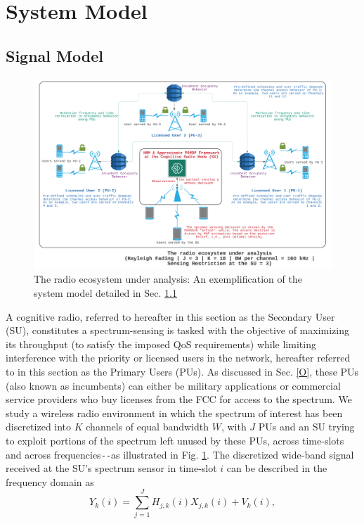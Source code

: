 \documentclass[12pt, draftcls, onecolumn]{IEEEtran}
\begin{document}
\section{System Model}\label{I}
\subsection{Signal Model}\label{I.I}
\begin{figure} [htb]
    \centerline{
    \includegraphics[width = 1.0\textwidth]{System_Model_Minerva.png}}
    \caption{The radio ecosystem under analysis: An exemplification of the system model detailed in Sec. \ref{I.I}}
    \label{fig: A.0}
\end{figure}
A cognitive radio, referred to hereafter in this section as the Secondary User (SU), constitutes a spectrum-sensing is tasked with the objective of maximizing its throughput (to satisfy the imposed QoS requirements) while limiting interference with the priority or licensed users in the network, hereafter referred to in this section as the Primary Users (PUs). As discussed in Sec.  \ref{O}, these PUs (also known as incumbents) can either be military applications or commercial service providers who buy licenses from the FCC for access to the spectrum. We study a wireless radio environment in which the spectrum of interest has been discretized into $K$ channels of equal bandwidth $W$, with $J$ PUs and an SU trying to exploit portions of the spectrum left unused by these PUs, across time-slots and across frequencies\texttt{-{}-}as illustrated in Fig. \ref{fig: A.0}. The discretized wide-band signal received at the SU's spectrum sensor in time-slot $i$ can be described in the frequency domain as
\begin{equation}\label{1}
    Y_{k}(i)=\sum_{j{=}1}^{J}{H_{j,k}(i)X_{j,k}(i)+V_{k}(i)},
\end{equation}
\end{document}
